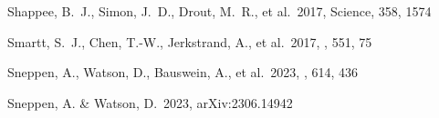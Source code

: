 \documentclass[twocolumn,twocolappendix]{aastex63}
\begin{document}
\begin{thebibliography}{}




 Shappee, B.~J., Simon, J.~D., Drout, M.~R., et al.\ 2017, Science, 358, 1574














 Smartt, S.~J., Chen, T.-W., Jerkstrand, A., et al.\ 2017, \nat, 551, 75



 Sneppen, A., Watson, D., Bauswein, A., et al.\ 2023, \nat, 614, 436


 Sneppen, A. \& Watson, D.\ 2023, arXiv:2306.14942









\end{thebibliography}
\end{document}
